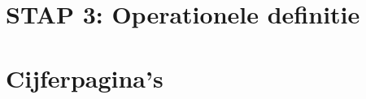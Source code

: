 \documentclass{SVnote}
\begin{document}
\section{STAP 3: Operationele definitie}














\section{Cijferpagina's}
\end{document}
